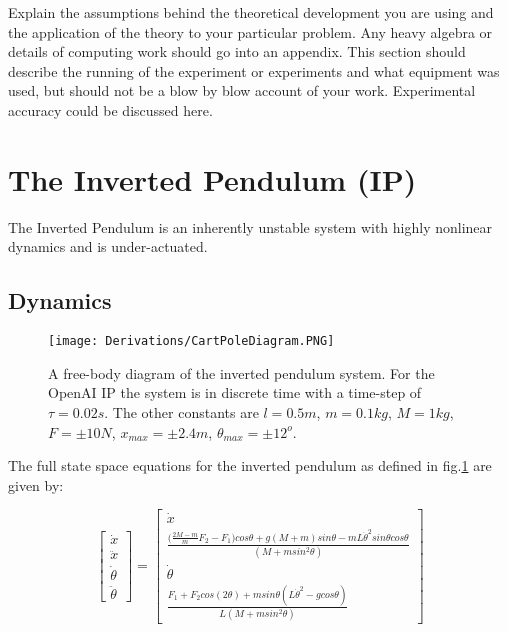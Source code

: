 \documentclass[main.tex]{subfiles}
\begin{document}
Explain the assumptions behind the theoretical development you are using and the application of the theory to your particular problem. Any heavy algebra or details of computing work should go into an appendix.
This section should describe the running of the experiment or experiments and what equipment was used, but should not be a blow by blow account of your work. Experimental accuracy could be discussed here.

\section{The Inverted Pendulum (IP)}
The Inverted Pendulum is an inherently unstable system with highly nonlinear dynamics and is under-actuated.

\subsection{Dynamics}

\begin{figure}[ht]
    \centering
    \texttt{[image: Derivations/CartPoleDiagram.PNG]}
    \caption{A free-body diagram of the inverted pendulum system. For the OpenAI IP the system is in discrete time with a time-step of $\tau = 0.02s$. The other constants are $l = 0.5m$, $m=0.1kg$, $M=1kg$, $F=\pm10N$, $x_{max}=\pm 2.4m$, $\theta_{max} = \pm 12^o$.}
    \label{fig:invpen}
\end{figure}

The full state space equations for the inverted pendulum as defined in fig.\ref{fig:invpen} are given by:

\begin{equation}
\begin{bmatrix} \dot{x} \\ \ddot{x} \\ \dot{\theta} \\ \ddot{\theta} \end{bmatrix}  =
\begin{bmatrix} \dot{x} \\ \frac{\big(\frac{2M-m}{m}F_2-F_1\big)cos\theta + g(M+m)sin\theta - mL\dot{\theta}^2 sin\theta cos\theta}{(M + msin^2\theta)} \\ \dot{\theta} \\ \frac{F_1 + F_2cos(2\theta)+ msin\theta(L\dot{\theta}^2-gcos\theta)}{L(M+msin^2\theta)} \end{bmatrix} 
\end{equation}
\end{document}
